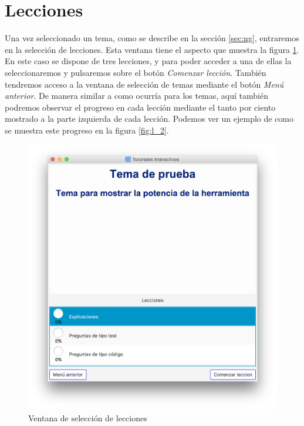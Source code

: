 \documentclass[]{article}
\begin{document}
\section{Lecciones}

Una vez seleccionado un tema, como se describe en la sección \ref{sec:ng}, entraremos en la selección de lecciones. Esta ventana tiene el aspecto que muestra la figura \ref{fig:l_1}. En este caso se dispone de tres lecciones, y para poder acceder a una de ellas la seleccionaremos y pulsaremos sobre el botón \emph{Comenzar lección}. También tendremos acceso a la ventana de selección de temas mediante el botón \emph{Menú anterior}. De manera similar a como ocurría para los temas, aquí también podremos observar el progreso en cada lección mediante el tanto por ciento mostrado a la parte izquierda de cada lección. Podemos ver un ejemplo de como se muestra este progreso en la figura \ref{fig:l_2}.

%
\begin{figure}[tbp]
\begin{center}
\includegraphics[scale=0.35]{l_1.png}
\end{center}
\caption{Ventana de selección de lecciones\label{fig:l_1}}
\end{figure}
%
\end{document}
